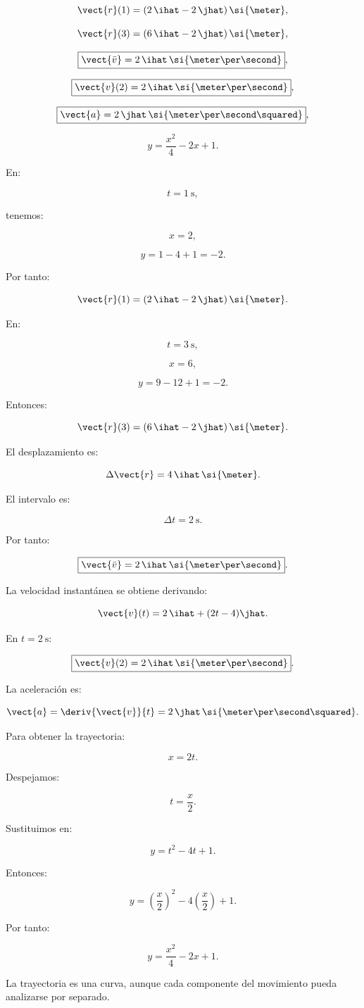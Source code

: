 \begin{respuesta}
\[
\vect{r}(1)
=
(2\,\ihat-2\,\jhat)\,\si{\meter},
\]

\[
\vect{r}(3)
=
(6\,\ihat-2\,\jhat)\,\si{\meter},
\]

\[
\boxed{
\vect{\bar{v}}
=
2\,\ihat\,
\si{\meter\per\second}
},
\]

\[
\boxed{
\vect{v}(2)
=
2\,\ihat\,
\si{\meter\per\second}
},
\]

\[
\boxed{
\vect{a}
=
2\,\jhat\,
\si{\meter\per\second\squared}
},
\]

\[
\boxed{
y=\frac{x^2}{4}-2x+1
}.
\]
\end{respuesta}

\begin{explicacion}
En:

\[
t=\SI{1}{\second},
\]

tenemos:

\[
x=2,
\]

\[
y=1-4+1=-2.
\]

Por tanto:

\[
\vect{r}(1)
=
(2\,\ihat-2\,\jhat)\,\si{\meter}.
\]

En:

\[
t=\SI{3}{\second},
\]

\[
x=6,
\]

\[
y=9-12+1=-2.
\]

Entonces:

\[
\vect{r}(3)
=
(6\,\ihat-2\,\jhat)\,\si{\meter}.
\]

El desplazamiento es:

\[
\Delta\vect{r}
=
4\,\ihat\,\si{\meter}.
\]

El intervalo es:

\[
\Delta t=\SI{2}{\second}.
\]

Por tanto:

\[
\boxed{
\vect{\bar{v}}
=
2\,\ihat\,
\si{\meter\per\second}
}.
\]

La velocidad instantánea se obtiene derivando:

\[
\vect{v}(t)
=
2\,\ihat+(2t-4)\jhat.
\]

En \(t=\SI{2}{\second}\):

\[
\boxed{
\vect{v}(2)
=
2\,\ihat\,
\si{\meter\per\second}
}.
\]

La aceleración es:

\[
\vect{a}
=
\deriv{\vect{v}}{t}
=
2\,\jhat\,
\si{\meter\per\second\squared}.
\]

Para obtener la trayectoria:

\[
x=2t.
\]

Despejamos:

\[
t=\frac{x}{2}.
\]

Sustituimos en:

\[
y=t^2-4t+1.
\]

Entonces:

\[
y
=
\left(\frac{x}{2}\right)^2
-
4\left(\frac{x}{2}\right)
+
1.
\]

Por tanto:

\[
\boxed{
y=\frac{x^2}{4}-2x+1
}.
\]

La trayectoria es una curva, aunque cada componente del movimiento pueda analizarse por separado.
\end{explicacion}


